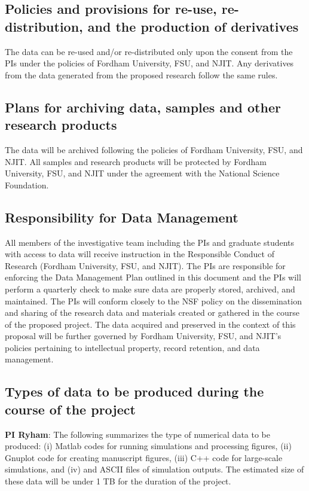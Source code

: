 \documentclass[11pt]{article}
\begin{document}
\subsection*{Policies and provisions for re-use, re-distribution, and
the production of derivatives}
The data can be re-used and/or re-distributed only upon the consent from
the PIs under the policies of Fordham University, FSU, and NJIT. Any
derivatives from the data generated from the proposed research follow
the same rules.

\subsection*{Plans for archiving data, samples and other research
products}
The data will be archived following the policies of Fordham University,
FSU, and NJIT. All samples and research products will be protected by
Fordham University, FSU, and NJIT under the agreement with the National
Science Foundation.

\subsection*{Responsibility for Data Management}
All members of the investigative team including the PIs and graduate
students with access to data will receive instruction in the Responsible
Conduct of Research (Fordham University, FSU, and NJIT). The PIs are
responsible for enforcing the Data Management Plan outlined in this
document and the PIs will perform a quarterly check to make sure data
are properly stored, archived, and maintained. The PIs will conform
closely to the NSF policy on the dissemination and sharing of the
research data and materials created or gathered in the course of the
proposed project. The data acquired and preserved in the context of
this proposal will be further governed by Fordham University, FSU, and
NJIT's policies pertaining to intellectual property, record retention,
and data
management.

\subsection*{Types of data to be produced during the course of the
project}
{\bf PI Ryham}:
The following summarizes the type of numerical data to
be produced:
(i) Matlab codes for running simulations and
processing figures,
(ii) Gnuplot code for creating manuscript figures, 
(iii) C++ code for large-scale simulations, and 
(iv) and ASCII files of simulation outputs. The estimated size of these
data will be under 1 TB for the duration of the project.
\end{document}
